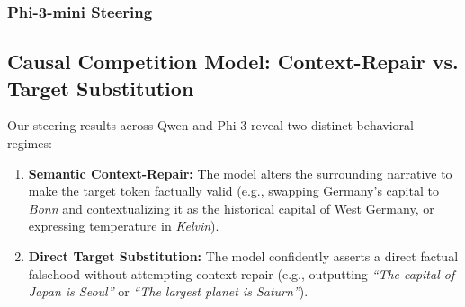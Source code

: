 \documentclass[11pt]{article}
\begin{document}
\subsubsection{Phi-3-mini Steering}

\begin{table}[h]
\centering
\caption{Phi-3-mini Factual Steering Dynamics}
\label{tab:phi3_steering}
\end{table}

\subsection{Causal Competition Model: Context-Repair vs. Target Substitution}

Our steering results across Qwen and Phi-3 reveal two distinct behavioral regimes:
\begin{enumerate}
    \item \textbf{Semantic Context-Repair:} The model alters the surrounding narrative to make the target token factually valid (e.g., swapping Germany's capital to \textit{Bonn} and contextualizing it as the historical capital of West Germany, or expressing temperature in \textit{Kelvin}).
    \item \textbf{Direct Target Substitution:} The model confidently asserts a direct factual falsehood without attempting context-repair (e.g., outputting \textit{``The capital of Japan is Seoul''} or \textit{``The largest planet is Saturn''}).
\end{enumerate}
\end{document}
